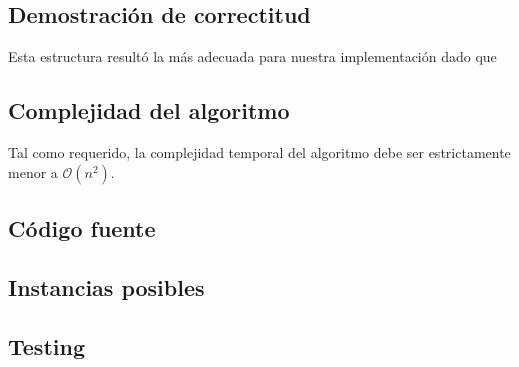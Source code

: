\subsection{Demostración de correctitud}
Esta estructura resultó la más adecuada para nuestra implementación dado que 



\subsection{Complejidad del algoritmo}
Tal como requerido, la complejidad temporal del algoritmo debe ser estrictamente menor a $\mathcal{O}(n^2)$.


\subsection{Código fuente}



\subsection{Instancias posibles}



\subsection{Testing}

